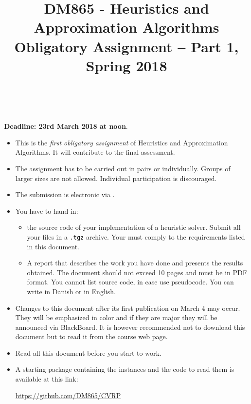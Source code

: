 \documentclass[a4paper,10pt]{article}
\title{\begin{flushleft}
DM865 - Heuristics and Approximation Algorithms\\[0.3cm]
{\Large Obligatory Assignment -- Part 1, Spring 2018 %
}
\\
\hrulefill
\\[-1.8cm]
\end{flushleft}
}
\author{}
\date{}
\begin{document}
\maketitle

\begin{center}
{\textbf{Deadline: 23rd March 2018 at noon}.}
\end{center}
\bigskip



\begin{itemize}

\item This is the \emph{first obligatory assignment} of Heuristics and
  Approximation Algorithms. It will contribute to the final assessment.

\item The assignment has to be carried out in pairs or
  individually. Groups of larger sizes are not allowed. Individual
  participation is discouraged.

\item The submission is electronic via
  .

\item  You have to hand in:
  \begin{itemize}
  \item the source code of your implementation of a heuristic
    solver. Submit all your files in a \lstinline{.tgz} archive. Your
    must comply to the requirements listed in this document.
    
  \item A report that describes the work you have done and presents the
    results obtained. The document should not exceed 10 pages and must
    be in PDF format. You cannot list source code, in case use
    pseudocode. You can write in Danish or in English.
  \end{itemize} 

%

\item Changes to this document after its first publication on March 4
  may occur. They will be emphasized in color and if they are major they
  will be announced via BlackBoard. It is however recommended not to
  download this document but to read it from the course web page.

\item Read all this document before you start to work.

\item A starting package containing the instances and the code to read
  them is available at this link:
\begin{center}
\url{https://github.com/DM865/CVRP}
\end{center}
\end{itemize}









\end{document}
